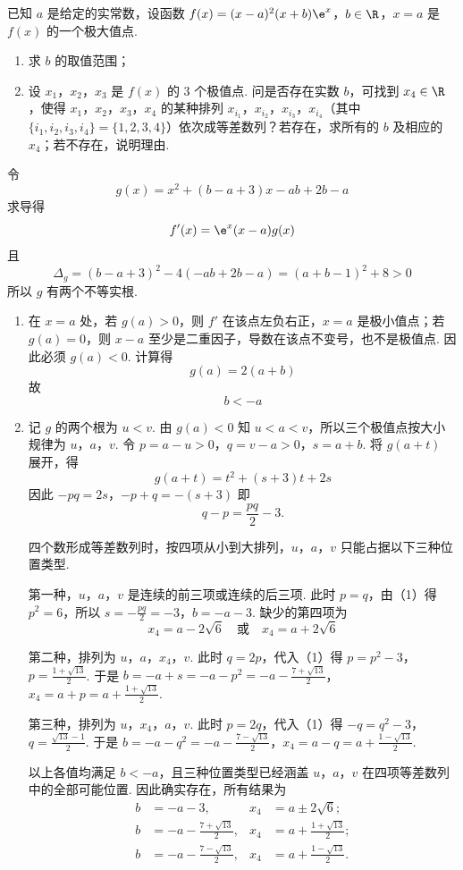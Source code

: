 \begin{problem}
已知 \(a\) 是给定的实常数，设函数 \(f(x) = (x - a)^2 (x + b)\e^x\)，\(b \in \R\)，\(x = a\) 是 \(f(x)\) 的一个极大值点.

\begin{enumerate}
\item 求 \(b\) 的取值范围；
\item 设 \(x_{1}\)，\(x_{2}\)，\(x_{3}\) 是 \(f(x)\) 的 3 个极值点. 问是否存在实数 \(b\)，可找到 \(x_{4} \in \R\)，使得 \(x_{1}\)，\(x_{2}\)，\(x_{3}\)，\(x_{4}\) 的某种排列 \(x_{i_{1}}\)，\(x_{i_{2}}\)，\(x_{i_{3}}\)，\(x_{i_{4}}\)（其中 \(\{i_{1}, i_{2}, i_{3}, i_{4}\} = \{1, 2, 3, 4\}\)）依次成等差数列？若存在，求所有的 \(b\) 及相应的 \(x_4\)；若不存在，说明理由.
\end{enumerate}

\begin{solution}
令
\[
g(x)=x^2+(b-a+3)x-ab+2b-a
\]
求导得
\[
f'(x)=\e^x(x-a)g(x)
\]
且
\[
\Delta_g=(b-a+3)^2-4(-ab+2b-a)=(a+b-1)^2+8>0
\]
所以 \(g\) 有两个不等实根.

\begin{enumerate}
\item 在 \(x=a\) 处，若 \(g(a)>0\)，则 \(f'\) 在该点左负右正，\(x=a\) 是极小值点；若 \(g(a)=0\)，则 \(x-a\) 至少是二重因子，导数在该点不变号，也不是极值点. 因此必须 \(g(a)<0\). 计算得
\[
g(a)=2(a+b)
\]
故
\[
b<-a
\]

\item 记 \(g\) 的两个根为 \(u<v\). 由 \(g(a)<0\) 知 \(u<a<v\)，所以三个极值点按大小规律为 \(u\)，\(a\)，\(v\). 令
\(p=a-u>0\)，\(q=v-a>0\)，\(s=a+b\).
将 \(g(a+t)\) 展开，得
\[
g(a+t)=t^2+(s+3)t+2s
\]
因此
\(-pq=2s\)，\(-p+q=-(s+3)\)
即
\[
q-p=\frac{pq}{2}-3. \tag{1}
\]

四个数形成等差数列时，按四项从小到大排列，\(u\)，\(a\)，\(v\) 只能占据以下三种位置类型.

第一种，\(u\)，\(a\)，\(v\) 是连续的前三项或连续的后三项. 此时 \(p=q\)，由（1）得 \(p^2=6\)，所以
\(s=-\frac{pq}{2}=-3\)，\(b=-a-3\).
缺少的第四项为
\[
x_4=a-2\sqrt6\quad\text{或}\quad x_4=a+2\sqrt6
\]

第二种，排列为 \(u\)，\(a\)，\(x_4\)，\(v\). 此时 \(q=2p\)，代入（1）得
\(p=p^2-3\)，\(p=\frac{1+\sqrt{13}}2\).
于是
\(b=-a+s=-a-p^2=-a-\frac{7+\sqrt{13}}2\)，\(x_4=a+p=a+\frac{1+\sqrt{13}}2\).

第三种，排列为 \(u\)，\(x_4\)，\(a\)，\(v\). 此时 \(p=2q\)，代入（1）得
\(-q=q^2-3\)，\(q=\frac{\sqrt{13}-1}{2}\).
于是
\(b=-a-q^2=-a-\frac{7-\sqrt{13}}2\)，\(x_4=a-q=a+\frac{1-\sqrt{13}}2\).

以上各值均满足 \(b<-a\)，且三种位置类型已经涵盖 \(u\)，\(a\)，\(v\) 在四项等差数列中的全部可能位置. 因此确实存在，所有结果为
\[
\begin{aligned}
b&=-a-3, &x_4&=a\pm2\sqrt6;\\
b&=-a-\frac{7+\sqrt{13}}2, &x_4&=a+\frac{1+\sqrt{13}}2;\\
b&=-a-\frac{7-\sqrt{13}}2, &x_4&=a+\frac{1-\sqrt{13}}2.
\end{aligned}
\]
\end{enumerate}
\end{solution}
\end{problem}
